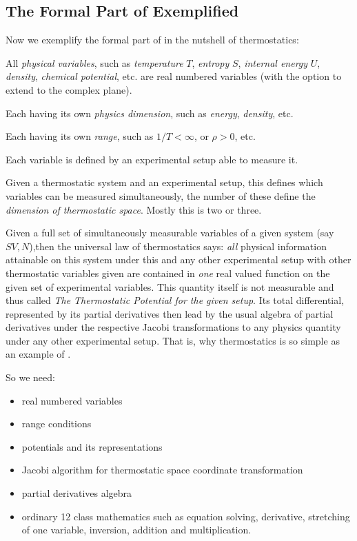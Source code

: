 \subsection{The Formal Part of {\physml} Exemplified}
Now we exemplify the formal part of {\physml} in the nutshell of thermostatics:

All {\emph{physical variables}}, such as {\emph{temperature}} $T$, {\emph{entropy}} $S$,
{\emph{internal energy}} $U$, {\emph{density}}, {\emph{chemical potential}}, etc. are real
numbered variables (with the option to extend to the complex plane).

Each having its own {\emph{physics dimension}}, such as {\emph{energy}}, {\emph{density}},
etc.

Each having its own {\emph{range}}, such as $1/T < \infty$, or $\rho>0 $, etc.

Each variable is defined by an experimental setup able to measure it.

Given a thermostatic system and an experimental setup, this defines which variables can be
measured simultaneously, the number of these define the {\emph{dimension of thermostatic
    space}}.  Mostly this is two or three.

Given a full set of simultaneously measurable variables of a given system (say
$SV,N$),then the universal law of thermostatics says: {\emph{all}} physical information
attainable on this system under this and any other experimental setup with other
thermostatic variables given are contained in {\emph{one}} real valued function on the
given set of experimental variables.  This quantity itself is not measurable and thus
called {\emph{The Thermostatic Potential for the given setup}}. Its total differential,
represented by its partial derivatives then lead by the usual algebra of partial
derivatives under the respective Jacobi transformations to any physics quantity under any
other experimental setup.  That is, why thermostatics is so simple as an example of
{\physml}.

So we need:
\begin{itemize}
\item real numbered variables
\item range conditions
\item potentials and its representations
\item Jacobi algorithm for thermostatic space coordinate transformation
\item partial derivatives algebra
\item ordinary 12 class mathematics such as equation solving, derivative, stretching of
  one variable, inversion, addition and multiplication.
\end{itemize}

